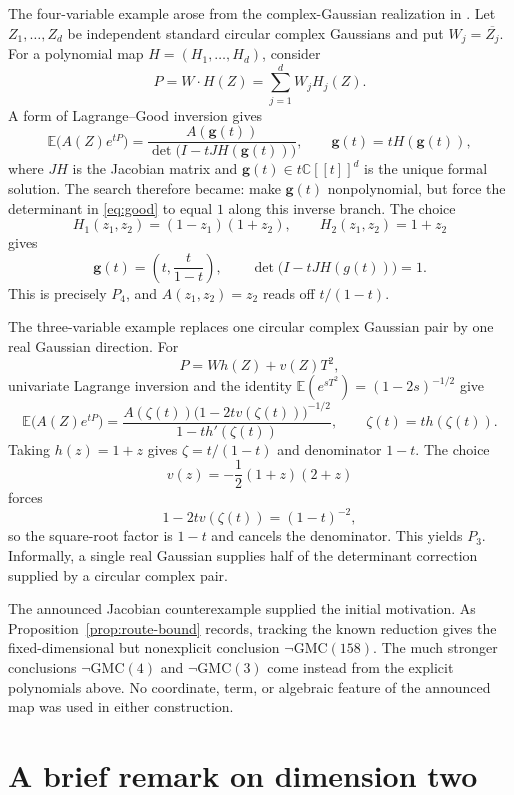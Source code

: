 \documentclass[11pt]{article}
\newcommand{\C}{\mathbb C}
\newcommand{\E}{\mathbb E}
\newcommand{\GMC}{\mathrm{GMC}}
\theoremstyle{remark}
\begin{document}
The four-variable example arose from the complex-Gaussian realization in \cite[Proposition~3.2]{DVEZ}.  Let $Z_1,\dots,Z_d$ be independent standard circular complex Gaussians and put $W_j=\overline{Z_j}$.  For a polynomial map $H=(H_1,\dots,H_d)$, consider
\[
  P=W\mathbin{\cdot}H(Z)=\sum_{j=1}^d W_jH_j(Z).
\]
A form of Lagrange--Good inversion \cite{Good} gives
\begin{equation}\label{eq:good}
  \E\bigl(A(Z)e^{tP}\bigr)
  =\frac{A(\boldsymbol g(t))}{\det\bigl(I-tJH(\boldsymbol g(t))\bigr)},
  \qquad \boldsymbol g(t)=tH(\boldsymbol g(t)),
\end{equation}
where $JH$ is the Jacobian matrix and $\boldsymbol g(t)\in t\C[[t]]^d$ is the unique formal solution.
The search therefore became: make $\boldsymbol g(t)$ nonpolynomial, but force the determinant in \eqref{eq:good} to equal $1$ along this inverse branch.  The choice
\[
  H_1(z_1,z_2)=(1-z_1)(1+z_2),
  \qquad H_2(z_1,z_2)=1+z_2
\]
gives
\[
  \boldsymbol g(t)=\left(t,\frac{t}{1-t}\right),
  \qquad
  \det\bigl(I-tJH(g(t))\bigr)=1.
\]
This is precisely $P_4$, and $A(z_1,z_2)=z_2$ reads off $t/(1-t)$.

The three-variable example replaces one circular complex Gaussian pair by one real Gaussian direction.  For
\[
  P=Wh(Z)+v(Z)T^2,
\]
univariate Lagrange inversion and the identity $\E(e^{sT^2})=(1-2s)^{-1/2}$ give
\begin{equation}\label{eq:half-pair}
  \E\bigl(A(Z)e^{tP}\bigr)
  =\frac{A(\zeta(t))\bigl(1-2t v(\zeta(t))\bigr)^{-1/2}}
         {1-th'(\zeta(t))},
  \qquad \zeta(t)=t h(\zeta(t)).
\end{equation}
Taking $h(z)=1+z$ gives $\zeta=t/(1-t)$ and denominator $1-t$.  The choice
\[
  v(z)=-\frac12(1+z)(2+z)
\]
forces
\[
  1-2t v(\zeta(t))=(1-t)^{-2},
\]
so the square-root factor is $1-t$ and cancels the denominator.  This yields $P_3$.  Informally, a single real Gaussian supplies half of the determinant correction supplied by a circular complex pair.

The announced Jacobian counterexample supplied the initial motivation.  As Proposition~\ref{prop:route-bound} records, tracking the known reduction gives the fixed-dimensional but nonexplicit conclusion $\neg\GMC(158)$.  The much stronger conclusions $\neg\GMC(4)$ and $\neg\GMC(3)$ come instead from the explicit polynomials above.  No coordinate, term, or algebraic feature of the announced map was used in either construction.

\section{A brief remark on dimension two}
\end{document}

